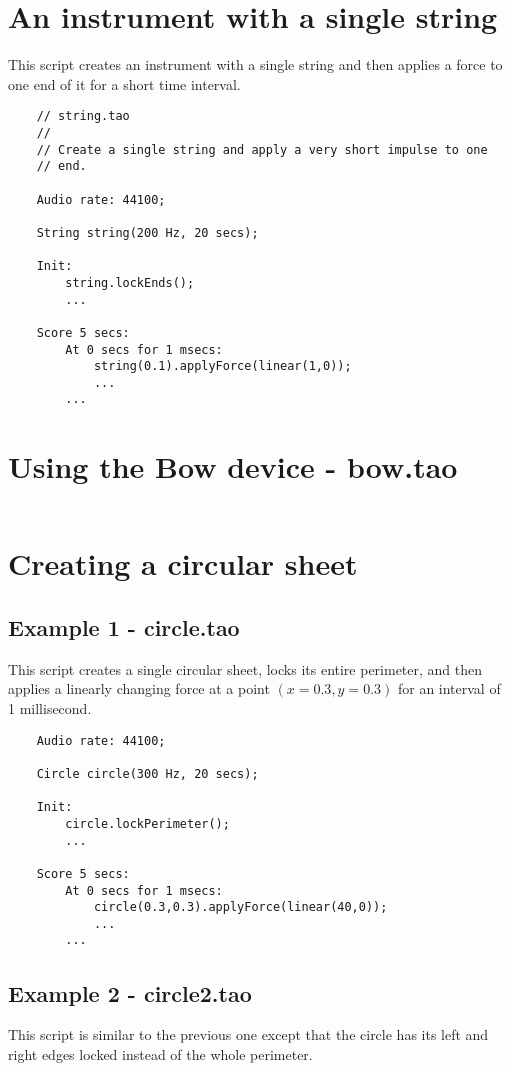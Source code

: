 \section{An instrument with a single string}
This script creates an instrument with a single string and then applies
a force to one end of it for a short time interval.

\begin{verbatim}
    // string.tao
    //
    // Create a single string and apply a very short impulse to one
    // end. 
    
    Audio rate: 44100;
    
    String string(200 Hz, 20 secs);
    
    Init:
        string.lockEnds();
        ...
    
    Score 5 secs:
        At 0 secs for 1 msecs:
            string(0.1).applyForce(linear(1,0));
            ...
        ...    
\end{verbatim}
 
\section{Using the Bow device - bow.tao}
\begin{verbatim}
\end{verbatim}
     
\section{Creating a circular sheet}
\subsection{Example 1 - circle.tao}
This script creates a single circular sheet, locks its entire
perimeter, and then applies a linearly changing force at a point
$(x=0.3,y=0.3)$ for an interval of 1 millisecond.

\begin{verbatim}
    Audio rate: 44100;
        
    Circle circle(300 Hz, 20 secs);
        
    Init:
        circle.lockPerimeter();
        ...
        
    Score 5 secs:
        At 0 secs for 1 msecs:
            circle(0.3,0.3).applyForce(linear(40,0));
            ...
        ...
\end{verbatim}
 
\subsection{Example 2 - circle2.tao}
This script is similar to the previous one except that the circle has
its left and right edges locked instead of the whole perimeter.


